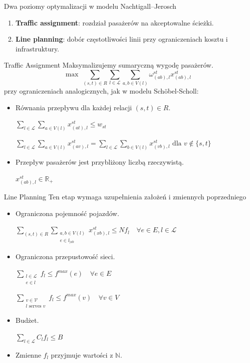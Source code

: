 \documentclass[ignorenonframetext]{beamer}
\newcommand{\formal}[1]{\par{\small\color{black!60}#1}}
\begin{document}
\begin{frame}{Dwa poziomy optymalizacji w modelu Nachtigall--Jerosch}
  \begin{enumerate}
  \item \textbf{Traffic assignment}: rozdział pasażerów na akceptowalne ścieżki.
  \item \textbf{Line planning}: dobór częstotliwości linii przy ograniczeniach kosztu i infrastruktury.
  \end{enumerate}
\end{frame}

\begin{frame}{Traffic Assignment}
  \small
  Maksymalizujemy sumaryczną wygodę pasażerów.
  \[
    \max \: \sum_{(s, t) \in R} \sum_{l \in \mathcal{L}} \sum_{a, b \in V(l)} \omega^{st}_{(ab), l} x^{st}_{(ab), l} 
  \]
  przy ograniczeniach analogicznych, jak w modelu Sch\"obel-Scholl:
  \begin{itemize}
  \item Równania przepływu dla każdej relacji \((s, t) \in R\).
    \formal{\(\sum_{l \in \mathcal{L}} \sum_{a \in V(l)} x^{st}_{(at), l} \le w_{st}\)}
    \formal{\(\sum_{l \in \mathcal{L}} \sum_{a \in V(l)} x^{st}_{(av), l} = \sum_{l \in \mathcal{L}} \sum_{b \in V(l)} x^{st}_{(vb), l} \text{ dla } v \not \in \{s, t\} \)}
  \item<2> Przepływ pasażerów jest przybliżony liczbą rzeczywistą.
    \formal{\(x^{st}_{(ab), l} \in \mathbb{R}_{+}\)}
  \end{itemize}
\end{frame}

\begin{frame}{Line Planning}
  Ten etap wymaga uzupełnienia założeń i zmiennych poprzedniego
  \begin{itemize}
  \item Ograniczona pojemność pojazdów.
    \formal{\(\sum_{(s, t) \in R} \sum_{\substack{a, b \in V(l) \\ e \in l_{|ab}}} x^{st}_{(xb), l} \le Nf_{l} \quad \forall e \in E, l \in \mathcal{L}\)}
  \item Ograniczona przepustowość sieci.
    \formal{\(\sum_{\substack{l \in \mathcal{L} \\ e \in l}} f_{l} \le f^{max}(e) \quad \forall e \in E\)}
    \formal{\(\sum_{\substack{v \in \mathcal{V} \\ l \text{ serves } v}} f_{l} \le f^{max}(v) \quad \forall v \in V \)}
  \item Budżet.
    \formal{\(\sum_{l \in \mathcal{L}} C_{l}f_{l} \le B \)}
    \item Zmienne \(f_{l}\) przyjmuje wartości z \(\mathbb{N}\).
  \end{itemize}  
\end{frame}
\end{document}
